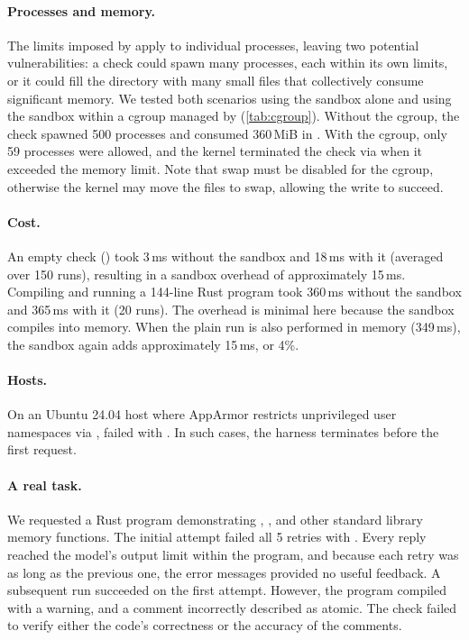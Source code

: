 \documentclass[10pt,twocolumn,a4paper]{article}
\begin{document}
\paragraph{Processes and memory.} The limits imposed by  apply to individual processes, leaving two potential vulnerabilities: a check could spawn many processes, each within its own limits, or it could fill the  directory with many small files that collectively consume significant memory. We tested both scenarios using the sandbox alone and using the sandbox within a cgroup managed by  (\cref{tab:cgroup}). Without the cgroup, the check spawned 500 processes and consumed 360\,MiB in . With the cgroup, only 59 processes were allowed, and the kernel terminated the check via  when it exceeded the memory limit. Note that swap must be disabled for the cgroup, otherwise the kernel may move the files to swap, allowing the write to succeed.

\paragraph{Cost.} An empty check () took 3\,ms without the sandbox and 18\,ms with it (averaged over 150 runs), resulting in a sandbox overhead of approximately 15\,ms. Compiling and running a 144-line Rust program took 360\,ms without the sandbox and 365\,ms with it (20 runs). The overhead is minimal here because the sandbox compiles into memory. When the plain run is also performed in memory (349\,ms), the sandbox again adds approximately 15\,ms, or 4\%.

\paragraph{Hosts.} On an Ubuntu 24.04 host where AppArmor restricts unprivileged user namespaces via ,  failed with . In such cases, the harness terminates before the first request.

\paragraph{A real task.} We requested a Rust program demonstrating , , and other standard library memory functions. The initial attempt failed all 5 retries with . Every reply reached the model's output limit within the program, and because each retry was as long as the previous one, the error messages provided no useful feedback. A subsequent run succeeded on the first attempt. However, the program compiled with a warning, and a comment incorrectly described  as atomic. The check failed to verify either the code's correctness or the accuracy of the comments.
\end{document}

